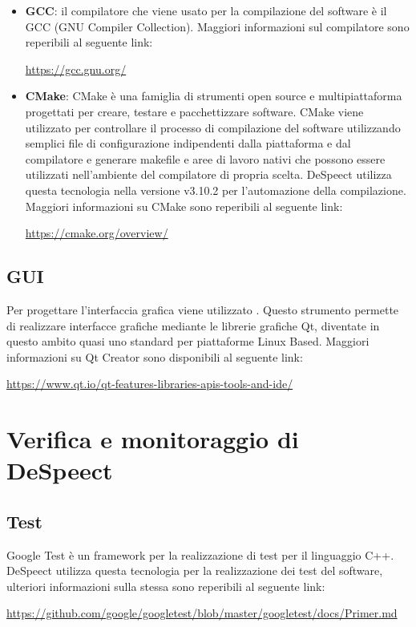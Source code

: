\documentclass[openany,12pt,a4paper]{report}
\begin{document}
	\begin{itemize}
	\item \textbf{GCC}: il compilatore che viene usato per la compilazione del software è il GCC (GNU Compiler Collection). Maggiori informazioni sul compilatore sono reperibili al seguente link:
	\begin{center}
		\centerline{\url{https://gcc.gnu.org/}}
	\end{center}
	
	\item \textbf{CMake}: CMake è una famiglia di strumenti open source e multipiattaforma progettati per creare, testare e pacchettizzare software. CMake viene utilizzato per controllare il processo di compilazione del software utilizzando semplici file di configurazione indipendenti dalla piattaforma e dal compilatore e generare makefile e aree di lavoro nativi che possono essere utilizzati nell'ambiente del compilatore di propria scelta. DeSpeect utilizza questa tecnologia nella versione v3.10.2 per l’automazione della compilazione. Maggiori informazioni su CMake sono reperibili al seguente link:
	\begin{center}
		\centerline{\url{https://cmake.org/overview/}}
	\end{center}
	
	\end{itemize}
	
	\subsection{GUI}
	
	Per progettare l'interfaccia grafica viene utilizzato . Questo strumento permette di realizzare interfacce grafiche mediante le librerie grafiche Qt, diventate in questo ambito quasi uno standard per piattaforme Linux Based.  Maggiori informazioni su Qt Creator sono disponibili al seguente link:
	\begin{center}
	\centerline{\url{https://www.qt.io/qt-features-libraries-apis-tools-and-ide/}}
	\end{center}

	
	\section{Verifica e monitoraggio di DeSpeect}	
	
	\subsection{Test}
	Google Test è un framework per la realizzazione di test per il linguaggio C++. DeSpeect utilizza questa tecnologia per la realizzazione dei test del software, ulteriori informazioni sulla stessa sono reperibili al seguente link:
	\begin{center}
		\url{https://github.com/google/googletest/blob/master/googletest/docs/Primer.md}
	\end{center}
\end{document}
